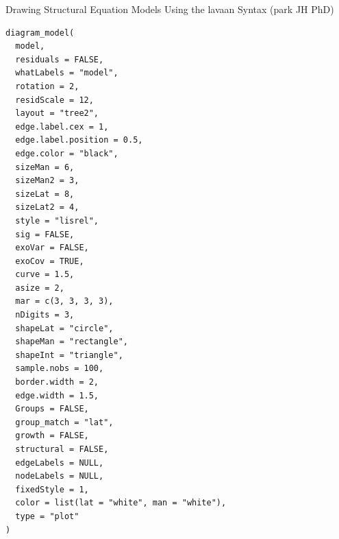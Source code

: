 \documentclass[a4paper]{book}
\begin{document}
%
\begin{Description}
Drawing Structural Equation Models Using the lavaan Syntax (park JH PhD)
\end{Description}
%
\begin{Usage}
\begin{verbatim}
diagram_model(
  model,
  residuals = FALSE,
  whatLabels = "model",
  rotation = 2,
  residScale = 12,
  layout = "tree2",
  edge.label.cex = 1,
  edge.label.position = 0.5,
  edge.color = "black",
  sizeMan = 6,
  sizeMan2 = 3,
  sizeLat = 8,
  sizeLat2 = 4,
  style = "lisrel",
  sig = FALSE,
  exoVar = FALSE,
  exoCov = TRUE,
  curve = 1.5,
  asize = 2,
  mar = c(3, 3, 3, 3),
  nDigits = 3,
  shapeLat = "circle",
  shapeMan = "rectangle",
  shapeInt = "triangle",
  sample.nobs = 100,
  border.width = 2,
  edge.width = 1.5,
  Groups = FALSE,
  group_match = "lat",
  growth = FALSE,
  structural = FALSE,
  edgeLabels = NULL,
  nodeLabels = NULL,
  fixedStyle = 1,
  color = list(lat = "white", man = "white"),
  type = "plot"
)
\end{verbatim}
\end{Usage}
%
\end{document}
